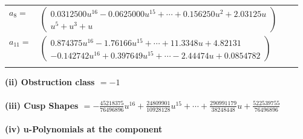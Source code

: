 \documentclass[1p]{elsarticle_modified}
\theoremstyle{definition}
\begin{document}
\begin{tabular}{m{7pt} m{180pt} m{7pt} m{180pt} }
\flushright $a_{8}=$&$\begin{pmatrix}0.0312500 u^{16}-0.0625000 u^{15}+\cdots+0.156250 u^{2}+2.03125 u\\u^5+u^3+u\end{pmatrix}$ \\
\flushright $a_{11}=$&$\begin{pmatrix}0.874375 u^{16}-1.76166 u^{15}+\cdots+11.3348 u+4.82131\\-0.142742 u^{16}+0.397649 u^{15}+\cdots-2.44474 u+0.0854782\end{pmatrix}$\\&\end{tabular}
\flushleft \textbf{(ii) Obstruction class $= -1$}\\~\\
\flushleft \textbf{(iii) Cusp Shapes $= -\frac{45218375}{76496896} u^{16}+\frac{24809901}{10928128} u^{15}+\cdots+\frac{290991179}{38248448} u+\frac{522539755}{76496896}$}\\~\\
\newpage\renewcommand{\arraystretch}{1}
\flushleft \textbf{(iv) u-Polynomials at the component}\newline \\
\end{document}
